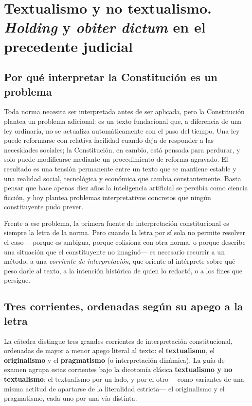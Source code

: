 \documentclass[12pt,oneside]{book}
\begin{document}
\chapter{Textualismo y no textualismo. \textit{Holding} y \textit{obiter dictum} en el precedente judicial}
\label{cap:p1}

\section{Por qué interpretar la Constitución es un problema}

Toda norma necesita ser interpretada antes de ser aplicada, pero la Constitución
plantea un problema adicional: es un texto fundacional que, a diferencia de una ley
ordinaria, no se actualiza automáticamente con el paso del tiempo. Una ley puede
reformarse con relativa facilidad cuando deja de responder a las necesidades
sociales; la Constitución, en cambio, está pensada para perdurar, y solo puede
modificarse mediante un procedimiento de reforma agravado. El resultado es una
tensión permanente entre un texto que se mantiene estable y una realidad social,
tecnológica y económica que cambia constantemente. Basta pensar que hace apenas
diez años la inteligencia artificial se percibía como ciencia ficción, y hoy plantea
problemas interpretativos concretos que ningún constituyente pudo prever.

Frente a ese problema, la primera fuente de interpretación constitucional es
siempre la letra de la norma. Pero cuando la letra por sí sola no permite resolver
el caso —porque es ambigua, porque colisiona con otra norma, o porque describe una
situación que el constituyente no imaginó— es necesario recurrir a un método, a una
\textit{corriente de interpretación}, que oriente al intérprete sobre qué peso darle
al texto, a la intención histórica de quien lo redactó, o a los fines que persigue.

\section{Tres corrientes, ordenadas según su apego a la letra}

La cátedra distingue tres grandes corrientes de interpretación constitucional,
ordenadas de mayor a menor apego literal al texto: el \textbf{textualismo}, el
\textbf{originalismo} y el \textbf{pragmatismo} (o interpretación dinámica). La
guía de examen agrupa estas corrientes bajo la dicotomía clásica
\textbf{textualismo y no textualismo}: el textualismo por un lado, y por el otro
—como variantes de una misma actitud de apartarse de la literalidad estricta— el
originalismo y el pragmatismo, cada uno por una vía distinta.
\end{document}
